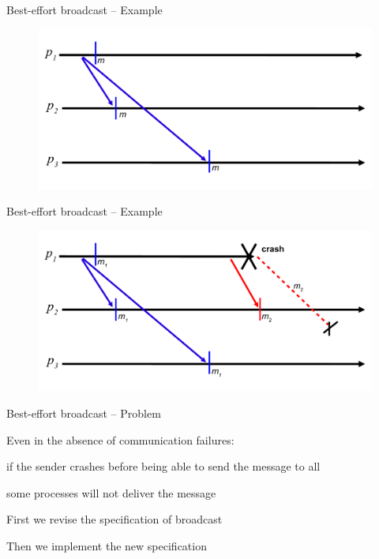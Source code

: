 \begin{frame}{Best-effort broadcast -- Example}
	
\begin{figure}
\includegraphics[width=\textwidth]{beb-normal}
\end{figure}

\end{frame}

\begin{frame}{Best-effort broadcast -- Example}
	
\begin{figure}
\includegraphics[width=\textwidth]{beb-failure}
\end{figure}

\end{frame}

\begin{frame}{Best-effort broadcast -- Problem}
	

\BIL
\item Even in the absence of communication failures:
\BI
\item if the sender crashes before being able to send  the message to all
\item some processes will not deliver the message
\EI
\EIL

\bigskip
{}

\BIL
\item First we revise the specification of broadcast
\item Then we implement the new specification	
\EIL

\end{frame}

